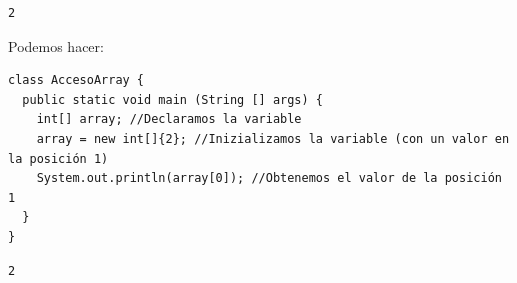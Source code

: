 \documentclass[11pt]{article}
\begin{document}
\begin{verbatim}
2
\end{verbatim}

Podemos hacer:

\begin{verbatim}
class AccesoArray {
  public static void main (String [] args) {
    int[] array; //Declaramos la variable
    array = new int[]{2}; //Inizializamos la variable (con un valor en la posición 1)
    System.out.println(array[0]); //Obtenemos el valor de la posición 1
  }
}

\end{verbatim}

\begin{verbatim}
2
\end{verbatim}
\end{document}
